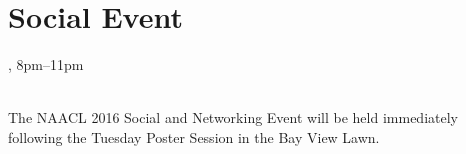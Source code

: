 \clearpage
\section{Social Event}
\setheaders{}{\daydateyear}

\begin{center}



\daydateyear, 8pm--11pm \vspace{1em}\\
\SocialLoc\\
\end{center}

The NAACL 2016 Social and Networking Event will be held immediately
following the Tuesday Poster Session in the Bay View Lawn. 
